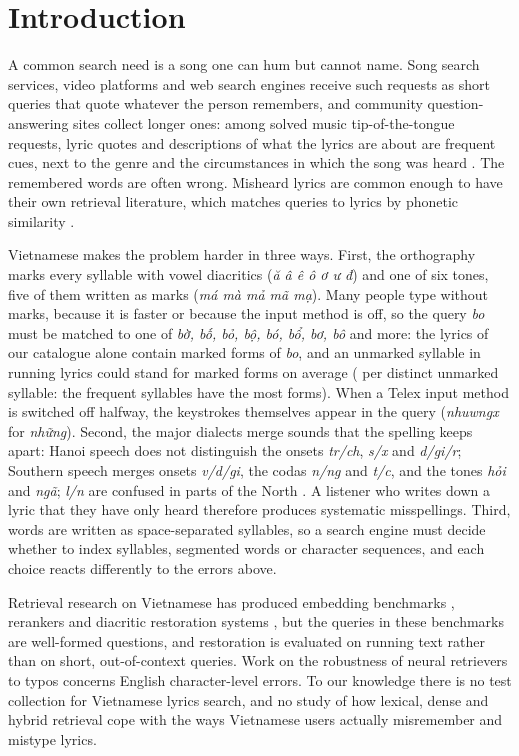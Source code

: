 \documentclass[11pt]{article}
\newcommand{\vi}[1]{\textit{#1}}          %
\begin{document}
\section{Introduction}

A common search need is a song one can hum but cannot name. Song search services, video platforms and web
search engines receive such requests as short queries that quote whatever the person remembers, and
community question-answering sites collect longer ones: among solved music tip-of-the-tongue requests,
lyric quotes and descriptions of what the lyrics are about are frequent cues, next to the genre and the
circumstances in which the song was heard \citep{bhargav2023music}. The remembered words are often wrong.
Misheard lyrics are common enough to have their own retrieval literature, which matches queries to lyrics by
phonetic similarity \citep{ring2009lucy,hirjee2010misheard}.

Vietnamese makes the problem harder in three ways. First, the orthography marks every syllable with vowel
diacritics (\vi{ă â ê ô ơ ư đ}) and one of six tones, five of them written as marks
(\vi{má mà mả mã mạ}). Many people type without marks, because it is faster or because the input method is
off, so the query \vi{bo} must be matched to one of \vi{bờ, bố, bỏ, bộ, bó, bổ, bơ, bô} and more: the lyrics of
our catalogue alone contain \NFormsBo{} marked forms of \vi{bo}, and an unmarked syllable in running lyrics
could stand for \FormsPerUnmarked{} marked forms on average (\RestFormsPerType{} per distinct unmarked syllable:
the frequent syllables have the most forms). When a
Telex input method is switched off halfway, the keystrokes themselves appear in the query
(\vi{nhuwngx} for \vi{những}). Second, the major dialects merge sounds that the spelling keeps apart: Hanoi
speech does not distinguish the onsets \vi{tr/ch}, \vi{s/x} and \vi{d/gi/r}; Southern speech merges onsets
\vi{v/d/gi}, the codas \vi{n/ng} and \vi{t/c}, and the tones \vi{hỏi} and \vi{ngã}; \vi{l/n} are confused in
parts of the North \citep{hoang2004phuongngu,kirby2011hanoi}. A listener who writes down a lyric that they
have only heard therefore produces systematic misspellings. Third, words are written as space-separated
syllables, so a search engine must decide whether to index syllables, segmented words or character
sequences, and each choice reacts differently to the errors above.

Retrieval research on Vietnamese has produced embedding benchmarks \citep{pham2025vnmteb,nguyen2024vcs},
rerankers \citep{dang2025viranker} and diacritic restoration systems
\citep{pham2017diacritic,dang2020tdp}, but the queries in these benchmarks are well-formed questions, and
restoration is evaluated on running text rather than on short, out-of-context queries. Work on the
robustness of neural retrievers to typos \citep{zhuang2021typos,zhuang2022characterbert,
sidiropoulos2022misspellings,penha2022variation} concerns English character-level errors. To our knowledge
there is no test collection for Vietnamese lyrics search, and no study of how lexical, dense and hybrid
retrieval cope with the ways Vietnamese users actually misremember and mistype lyrics.
\end{document}

